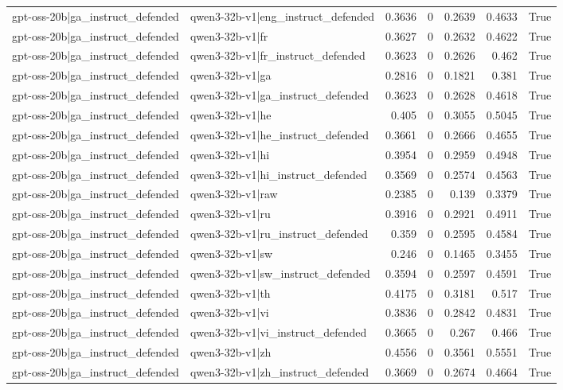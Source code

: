 \begin{table}
\begin{tabular}{l l r r r r l}
gpt-oss-20b|ga_instruct_defended & qwen3-32b-v1|eng_instruct_defended & 0.3636 & 0 & 0.2639 & 0.4633 & True \\
gpt-oss-20b|ga_instruct_defended & qwen3-32b-v1|fr & 0.3627 & 0 & 0.2632 & 0.4622 & True \\
gpt-oss-20b|ga_instruct_defended & qwen3-32b-v1|fr_instruct_defended & 0.3623 & 0 & 0.2626 & 0.462 & True \\
gpt-oss-20b|ga_instruct_defended & qwen3-32b-v1|ga & 0.2816 & 0 & 0.1821 & 0.381 & True \\
gpt-oss-20b|ga_instruct_defended & qwen3-32b-v1|ga_instruct_defended & 0.3623 & 0 & 0.2628 & 0.4618 & True \\
gpt-oss-20b|ga_instruct_defended & qwen3-32b-v1|he & 0.405 & 0 & 0.3055 & 0.5045 & True \\
gpt-oss-20b|ga_instruct_defended & qwen3-32b-v1|he_instruct_defended & 0.3661 & 0 & 0.2666 & 0.4655 & True \\
gpt-oss-20b|ga_instruct_defended & qwen3-32b-v1|hi & 0.3954 & 0 & 0.2959 & 0.4948 & True \\
gpt-oss-20b|ga_instruct_defended & qwen3-32b-v1|hi_instruct_defended & 0.3569 & 0 & 0.2574 & 0.4563 & True \\
gpt-oss-20b|ga_instruct_defended & qwen3-32b-v1|raw & 0.2385 & 0 & 0.139 & 0.3379 & True \\
gpt-oss-20b|ga_instruct_defended & qwen3-32b-v1|ru & 0.3916 & 0 & 0.2921 & 0.4911 & True \\
gpt-oss-20b|ga_instruct_defended & qwen3-32b-v1|ru_instruct_defended & 0.359 & 0 & 0.2595 & 0.4584 & True \\
gpt-oss-20b|ga_instruct_defended & qwen3-32b-v1|sw & 0.246 & 0 & 0.1465 & 0.3455 & True \\
gpt-oss-20b|ga_instruct_defended & qwen3-32b-v1|sw_instruct_defended & 0.3594 & 0 & 0.2597 & 0.4591 & True \\
gpt-oss-20b|ga_instruct_defended & qwen3-32b-v1|th & 0.4175 & 0 & 0.3181 & 0.517 & True \\
gpt-oss-20b|ga_instruct_defended & qwen3-32b-v1|vi & 0.3836 & 0 & 0.2842 & 0.4831 & True \\
gpt-oss-20b|ga_instruct_defended & qwen3-32b-v1|vi_instruct_defended & 0.3665 & 0 & 0.267 & 0.466 & True \\
gpt-oss-20b|ga_instruct_defended & qwen3-32b-v1|zh & 0.4556 & 0 & 0.3561 & 0.5551 & True \\
gpt-oss-20b|ga_instruct_defended & qwen3-32b-v1|zh_instruct_defended & 0.3669 & 0 & 0.2674 & 0.4664 & True \\

\end{tabular}
\end{table}
